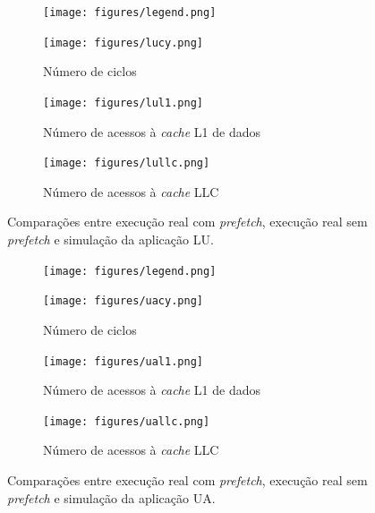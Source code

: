 \documentclass[12pt]{article}
\begin{document}
\begin{figure}[b!]
  \hspace{+25mm}
  \begin{subfigure}{0.33\textwidth}
    \centering
        \texttt{[image: figures/legend.png]}
    \label{fig:luleg}
  \end{subfigure}
  \vspace{-5mm}

  \begin{subfigure}{0.33\textwidth}
    \centering
    \vspace{-4mm}
        \texttt{[image: figures/lucy.png]}
    \caption{Número de ciclos}
    \label{fig:lucycles}
  \end{subfigure}%
  \begin{subfigure}{0.33\textwidth}
    \centering	
        \texttt{[image: figures/lul1.png]}
    \caption{Número de acessos à \textit{cache} L1 de dados}
    \label{fig:lul1}
  \end{subfigure}%
  \begin{subfigure}{0.33\textwidth}
    \centering	
        \texttt{[image: figures/lullc.png]}
    \caption{Número de acessos à \textit{cache} LLC}
    \label{fig:lullc}
  \end{subfigure}
  
  \caption{Comparações entre execução real com \textit{prefetch}, execução real sem \textit{prefetch} e simulação da aplicação LU.}
  \label{ref:lu}
\end{figure}

\begin{figure}[t!]
  \hspace{+25mm}
  \begin{subfigure}{0.33\textwidth}
    \centering
        \texttt{[image: figures/legend.png]}
    \label{fig:ualeg}
  \end{subfigure}
  \vspace{-5mm}

  \begin{subfigure}{0.33\textwidth}
    \centering
    \vspace{-4mm}
        \texttt{[image: figures/uacy.png]}
    \caption{Número de ciclos}
    \label{fig:uacycles}
  \end{subfigure}%
  \begin{subfigure}{0.33\textwidth}
    \centering	
        \texttt{[image: figures/ual1.png]}
    \caption{Número de acessos à \textit{cache} L1 de dados}
    \label{fig:ual1}
  \end{subfigure}%
  \begin{subfigure}{0.33\textwidth}
    \centering	
        \texttt{[image: figures/uallc.png]}
    \caption{Número de acessos à \textit{cache} LLC}
    \label{fig:uallc}
  \end{subfigure}
  
  \caption{Comparações entre execução real com \textit{prefetch}, execução real sem \textit{prefetch} e simulação da aplicação UA.}
  \label{ref:ua}
\end{figure}
\end{document}
